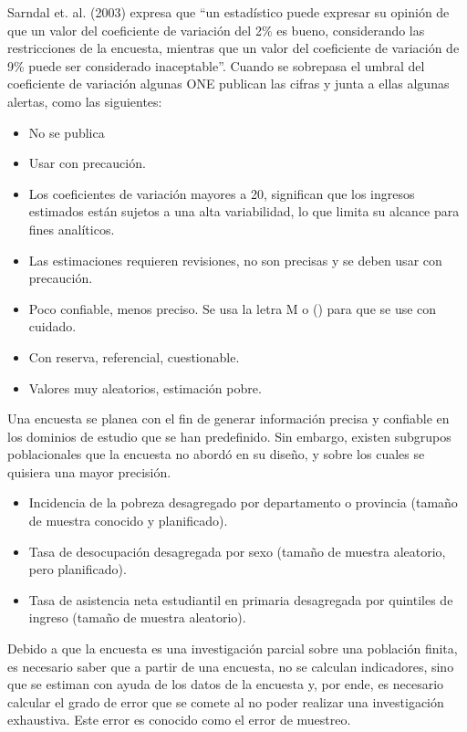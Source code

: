 Sarndal et. al. (2003) expresa que ``un estadístico puede expresar su opinión de que un valor del coeficiente de variación del 2\% es bueno, considerando las restricciones de la encuesta, mientras que un valor del coeficiente de variación de 9\% puede ser considerado inaceptable''. Cuando se sobrepasa el umbral del coeficiente de variación algunas ONE publican las cifras y junta a ellas algunas alertas, como las siguientes:

\begin{itemize}
\tightlist
\item
  No se publica
\item
  Usar con precaución.
\item
  Los coeficientes de variación mayores a 20, significan que los ingresos estimados están sujetos a una alta variabilidad, lo que limita su alcance para fines analíticos.
\item
  Las estimaciones requieren revisiones, no son precisas y se deben usar con precaución.
\item
  Poco confiable, menos preciso. Se usa la letra M o () para que se use con cuidado.
\item
  Con reserva, referencial, cuestionable.
\item
  Valores muy aleatorios, estimación pobre.
\end{itemize}

Una encuesta se planea con el fin de generar información precisa y confiable en los dominios de estudio que se han predefinido. Sin embargo, existen subgrupos poblacionales que la encuesta no abordó en su diseño, y sobre los cuales se quisiera una mayor precisión.

\begin{itemize}
\tightlist
\item
  Incidencia de la pobreza desagregado por departamento o provincia (tamaño de muestra conocido y planificado).
\item
  Tasa de desocupación desagregada por sexo (tamaño de muestra aleatorio, pero planificado).
\item
  Tasa de asistencia neta estudiantil en primaria desagregada por quintiles de ingreso (tamaño de muestra aleatorio).
\end{itemize}

Debido a que la encuesta es una investigación parcial sobre una población finita, es necesario saber que a partir de una encuesta, no se calculan indicadores, sino que se estiman con ayuda de los datos de la encuesta y, por ende, es necesario calcular el grado de error que se comete al no poder realizar una investigación exhaustiva. Este error es conocido como el error de muestreo.

